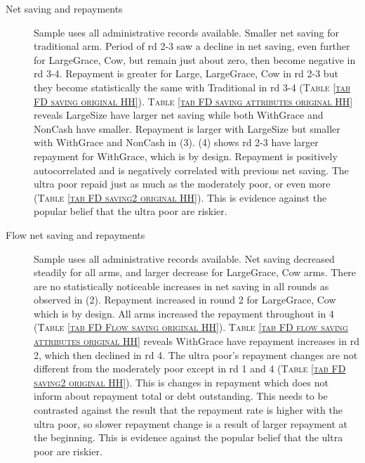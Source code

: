 \begin{description}
\vspace{1.0ex}\setlength{\itemsep}{1.0ex}\setlength{\baselineskip}{12pt}
\item[Net saving and repayments]	 Sample uses all administrative records available. Smaller net saving for \textsf{traditional} arm. Period of rd 2-3 saw a decline in net saving, even further for \textsf{LargeGrace, Cow}, but remain just about zero, then become negative in rd 3-4. Repayment is greater for \textsf{Large, LargeGrace, Cow} in rd 2-3 but they become statistically the same with \textsf{Traditional} in rd 3-4 (\textsc{Table \ref{tab FD saving original HH}}). \textsc{\normalsize Table \ref{tab FD saving attributes original HH}} reveals \textsf{LargeSize} have larger net saving while both \textsf{WithGrace} and \textsf{NonCash} have smaller. Repayment is larger with \textsf{LargeSize} but smaller with \textsf{WithGrace} and \textsf{NonCash} in (3). (4) shows rd 2-3 have larger repayment for \textsf{WithGrace}, which is by design. Repayment is positively autocorrelated and is negatively correlated with previous net saving. The ultra poor repaid just as much as the moderately poor, or even more (\textsc{Table \ref{tab FD saving2 original HH}}). This is evidence against the popular belief that the ultra poor are riskier.  
\item[Flow net saving and repayments]	 Sample uses all administrative records available. Net saving decreased steadily for all arms, and larger decrease for \textsf{LargeGrace, Cow} arms. There are no statistically noticeable increases in net saving in all rounds as observed in (2). Repayment increased in round 2 for \textsf{LargeGrace, Cow} which is by design. All arms increased the repayment throughout in 4 (\textsc{Table \ref{tab FD Flow saving original HH}}). 
\textsc{\normalsize Table \ref{tab FD flow saving attributes original HH}} reveals \textsf{WithGrace} have repayment increases in rd 2, which then declined in rd 4.
The ultra poor's repayment changes are not different from the moderately poor except in rd 1 and 4 (\textsc{Table \ref{tab FD saving2 original HH}}). This is changes in repayment which does not inform about repayment total or debt outstanding. This needs to be contrasted against the result that the repayment rate is higher with the ultra poor, so slower repayment change is a result of larger repayment at the beginning. This is evidence against the popular belief that the ultra poor are riskier.  

\end{description}
